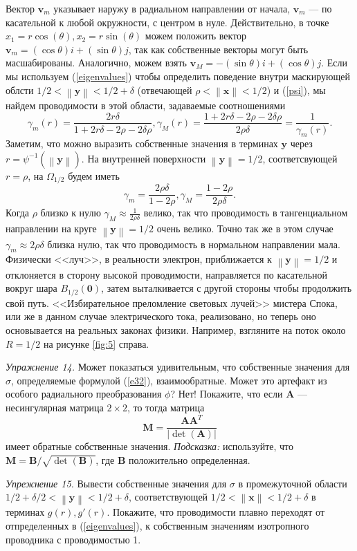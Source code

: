 \documentclass[a4paper, 12pt]{article}
\newcommand{\normb}[1]{\left\lVert\textbf{#1}\right\rVert}
\begin{document}
Вектор $\textbf{v}_m$ указывает наружу в радиальном направлении от начала,
$\textbf{v}_m$ --- по касательной к любой окружности, с центром в нуле. Действительно,
в точке $x_1 = r\cos(\theta), x_2 = r\sin(\theta)$ можем положить вектор 
$\textbf{v}_m = (\cos\theta)i+(\sin\theta)j$, так как собственные векторы могут быть
масшабированы. Аналогично, можем взять $\textbf{v}_M = -(\sin\theta)i+(\cos\theta)j$.
Если мы используем (\ref{eigenvalues}) чтобы определить поведение внутри маскирующей
облсти $1/2 < \normb{y} < 1/2 + \delta$ (отвечающей $\rho < 
\normb{x}<1/2$) и (\ref{psi}), мы найдем проводимости в этой области, 
задаваемые соотношениями
\begin{equation}
\gamma_m(r) = \frac{2r\delta}{1+2r\delta-2\rho-2\delta\rho},
\gamma_M(r)= \frac{1+2r\delta-2\rho-2\delta\rho}{2\rho\delta} = \frac{1}{\gamma_m(r)}.
\end{equation}
Заметим, что можно выразить собственные значения в терминах $\textbf{y}$ через
$r = \psi^{-1}(\normb{y})$. На внутренней поверхности $\normb{y}=1/2$,
соответсвующей $r = \rho$, на $\Omega_{1/2}$ будем иметь
\begin{equation*}
\gamma_m = \frac{2\rho\delta}{1-2\rho},
\gamma_M = \frac{1-2\rho}{2\rho\delta}.
\end{equation*}
Когда $\rho$ близко к нулю $\gamma_M \approx \frac{1}{2\rho\delta}$ велико, так что
проводимость в тангенциальном направлении на круге $\normb{y} = 1/2$ очень 
велико. Точно так же в этом случае $\gamma_m \approx 2\rho\delta$ близка нулю, так что
проводимость в нормальном направлении мала. Физически <<луч>>, в реальности электрон,
приближается к $\normb{y}=1/2$ и отклоняется в сторону высокой проводимости,
направляется по касательной вокруг шара $B_{1/2}(\textbf{0})$, затем выталкивается
с другой стороны чтобы продолжить свой путь. <<Избирательное преломление световых
лучей>> мистера Спока, или же в данном случае электрического тока, реализовано,
но теперь оно основывается на реальных законах физики. Например, взгляните 
на поток около $R=1/2$ на рисунке \ref{fig:5} справа.

\textit{Упражнение 14.} Может показаться удивительным, что собственные значения для
$\sigma$, определяемые формулой (\ref{e32}), взаимообратные. Может это артефакт
из особого радиального преобразования $\phi$? Нет! Покажите, что если $\textbf{A}$ 
--- 	несингулярная матрица $2 \times 2$, то тогда матрица
\begin{equation*}
\textbf{M} = \frac{\textbf{A}\textbf{A}^T}{|\det(\textbf{A})|}
\end{equation*}
имеет обратные собственные значения. \textit{Подсказка:} используйте, что $\textbf{M}
=  \textbf{B}/\sqrt{\det(\textbf{B})}$, где $\textbf{B}$ положительно определенная.

\textit{Упрежнение 15.} Вывести собственные значения для $\sigma$ в промежуточной
области $1/2 + \delta/2 < \normb{y} < 1/2+\delta$, соответствующей 
$1/2 < \normb{x} < 1/2+\delta$ в терминах $g(r), g'(r)$.
Покажите, что проводимости плавно переходят от отпределенных в (\ref{eigenvalues}),
к собственным значениям изотропного проводника с проводимостью 1.
\end{document}
